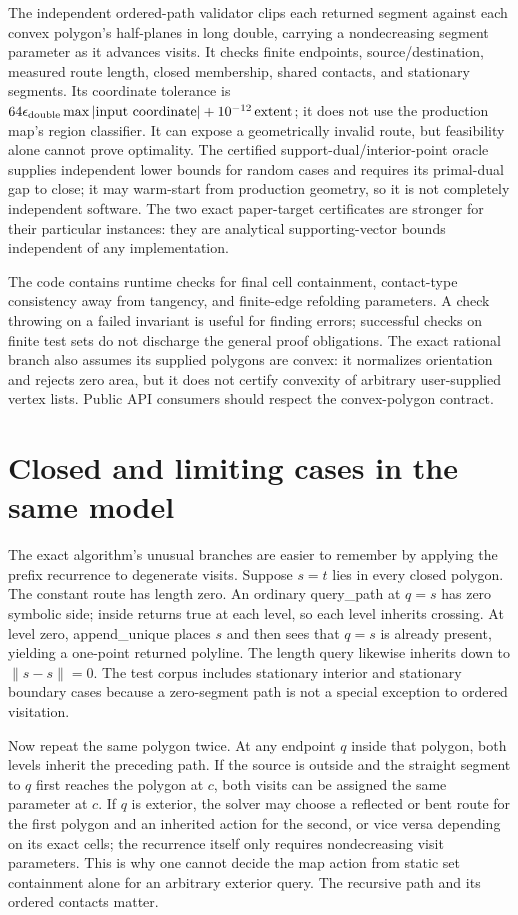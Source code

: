 \documentclass[12pt,a4paper]{article}
\newcommand{\norm}[1]{\lVert#1\rVert}
\newcommand{\code}[1]{{\ttfamily\color{codekw}#1}}
\begin{document}
The independent ordered-path validator clips each returned segment against each convex polygon's half-planes in long double, carrying a nondecreasing segment parameter as it advances visits. It checks finite endpoints, source/destination, measured route length, closed membership, shared contacts, and stationary segments. Its coordinate tolerance is \(64\epsilon_{\rm double}\max|\text{input coordinate}|+10^{-12}\,\text{extent}\); it does not use the production map's region classifier. It can expose a geometrically invalid route, but feasibility alone cannot prove optimality. The certified support-dual/interior-point oracle supplies independent lower bounds for random cases and requires its primal-dual gap to close; it may warm-start from production geometry, so it is not completely independent software. The two exact paper-target certificates are stronger for their particular instances: they are analytical supporting-vector bounds independent of any implementation.

The code contains runtime checks for final cell containment, contact-type consistency away from tangency, and finite-edge refolding parameters. A check throwing on a failed invariant is useful for finding errors; successful checks on finite test sets do not discharge the general proof obligations. The exact rational branch also assumes its supplied polygons are convex: it normalizes orientation and rejects zero area, but it does not certify convexity of arbitrary user-supplied vertex lists. Public API consumers should respect the convex-polygon contract.

\section{Closed and limiting cases in the same model}
The exact algorithm's unusual branches are easier to remember by applying the prefix recurrence to degenerate visits. Suppose \(s=t\) lies in every closed polygon. The constant route has length zero. An ordinary \code{query\_path} at \(q=s\) has zero symbolic side; \code{inside} returns true at each level, so each level inherits crossing. At level zero, \code{append\_unique} places \(s\) and then sees that \(q=s\) is already present, yielding a one-point returned polyline. The length query likewise inherits down to \(\norm{s-s}=0\). The test corpus includes stationary interior and stationary boundary cases because a zero-segment path is not a special exception to ordered visitation.

Now repeat the same polygon twice. At any endpoint \(q\) inside that polygon, both levels inherit the preceding path. If the source is outside and the straight segment to \(q\) first reaches the polygon at \(c\), both visits can be assigned the same parameter at \(c\). If \(q\) is exterior, the solver may choose a reflected or bent route for the first polygon and an inherited action for the second, or vice versa depending on its exact cells; the recurrence itself only requires nondecreasing visit parameters. This is why one cannot decide the map action from static set containment alone for an arbitrary exterior query. The recursive path and its ordered contacts matter.
\end{document}
